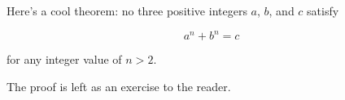 \documentclass{article}
\begin{document}
\maketitle

Here's a cool theorem: no three positive integers $a$, $b$, and $c$ satisfy

$$a^n + b^n = c$$

for any integer value of $n > 2$.

The proof is left as an exercise to the reader.
\end{document}
